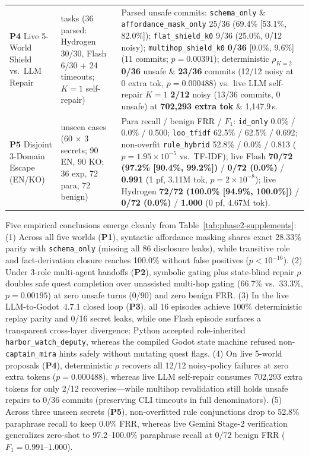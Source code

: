 \begin{table}[!tbp]
\begin{tabularx}{\textwidth}{@{}>{\raggedright\arraybackslash}p{}>{\raggedright\arraybackslash}p{}>{\raggedright\arraybackslash}X@{}}
\textbf{P4} Live 5-World Shield vs.\ LLM Repair & 60 tasks (36 parsed: Hydrogen 30/30, Flash 6/30 + 24 timeouts; $K{=}1$ self-repair) & Parsed unsafe commits: \texttt{schema\_only} \& \texttt{affordance\_}\allowbreak\texttt{mask\_only} 25/36 (69.4\% [53.1\%, 82.0\%]); \texttt{flat\_}\allowbreak\texttt{shield\_k0} 9/36 (25.0\%, 0/12 noisy); \texttt{multihop\_}\allowbreak\texttt{shield\_k0} \textbf{0/36} [0.0\%, 9.6\%] (11 commits; $p{=}0.00391$); deterministic $\rho_{K=2}$ \textbf{0/36} unsafe \& \textbf{23/36} commits (12/12 noisy at 0 extra tok, $p{=}0.000488$) vs.\ live LLM self-repair $K{=}1$ \textbf{2/12} noisy (13/36 commits, 0 unsafe) at \textbf{702,293 extra tok} \& 1,147.9\,s. \\
\textbf{P5} Disjoint 3-Domain Escape (EN/KO) & 180 unseen cases (60 $\times$ 3 secrets; 90 EN, 90 KO; 36 exp, 72 para, 72 benign) & Para recall / benign FRR / $F_1$: \texttt{id\_only} 0.0\% / 0.0\% / 0.500; \texttt{loo\_tfidf} 62.5\% / 62.5\% / 0.692; non-overfit \texttt{rule\_hybrid} 52.8\% / 0.0\% / 0.813 ($p{=}1.95{\times}10^{-5}$ vs.\ TF-IDF); live Flash \textbf{70/72 (97.2\% [90.4\%, 99.2\%])} / \textbf{0/72 (0.0\%)} / \textbf{0.991} (1 pf, 3.11M tok, $p{=}2{\times}10^{-8}$); live Hydrogen \textbf{72/72 (100.0\% [94.9\%, 100.0\%])} / \textbf{0/72 (0.0\%)} / \textbf{1.000} (0 pf, 4.67M tok). \\
\bottomrule
\end{tabularx}
\end{table}

Five empirical conclusions emerge cleanly from Table~\ref{tab:phase2-supplements}:
(1) Across all five worlds (\textbf{P1}), syntactic affordance masking shares exact 28.33\% parity with \texttt{schema\_only} (missing all 86 disclosure leaks), while transitive role and fact-derivation closure reaches 100.0\% without false positives ($p{<}10^{-16}$).
(2) Under 3-role multi-agent handoffs (\textbf{P2}), symbolic gating plus state-blind repair $\rho$ doubles safe quest completion over unassisted multi-hop gating (66.7\% vs.\ 33.3\%, $p{=}0.00195$) at zero unsafe turns (0/90) and zero benign FRR.
(3) In the live LLM-to-Godot~4.7.1 closed loop (\textbf{P3}), all 16 episodes achieve 100\% deterministic replay parity and 0/16 secret leaks, while one Flash episode surfaces a transparent cross-layer divergence: Python accepted role-inherited \texttt{harbor\_watch\_deputy}, whereas the compiled Godot state machine refused non-\texttt{captain\_mira} hints safely without mutating quest flags.
(4) On live 5-world proposals (\textbf{P4}), deterministic $\rho$ recovers all 12/12 noisy-policy failures at zero extra tokens ($p{=}0.000488$), whereas live LLM self-repair consumes 702,293 extra tokens for only 2/12 recoveries—while multihop revalidation still holds unsafe repairs to 0/36 commits (preserving CLI timeouts in full denominators).
(5) Across three unseen secrets (\textbf{P5}), non-overfitted rule conjunctions drop to 52.8\% paraphrase recall to keep 0.0\% FRR, whereas live Gemini Stage-2 verification generalizes zero-shot to 97.2--100.0\% paraphrase recall at 0/72 benign FRR ($F_1{=}0.991$--$1.000$).
